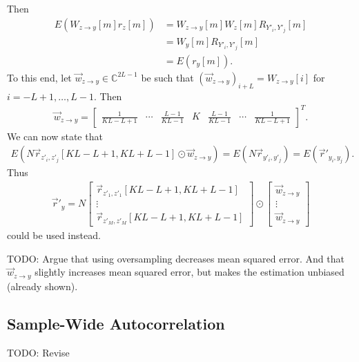 \documentclass[a4paper, openany, oneside]{memoir}
\begin{document}
Then
\begin{align*}
    E(W_{z \to y}[m]r_z[m]) &= W_{z \to y}[m] W_z[m] R_{Y'_i,Y'_j}[m] \\
    &= W_y[m] R_{Y'_i,Y'_j}[m] \\
    &= E(r_y[m]).
\end{align*}
To this end, let $\vec{w}_{z \to y} \in \mathbb{C}^{2L-1}$ be such that $(\vec{w}_{z \to y})_{i+L} = W_{z \to y}[i]$ for $i = -L+1,\ldots,L-1$. Then
\begin{align*}
    \vec{w}_{z \to y} =\begin{bmatrix}
        \frac{1}{KL - L + 1} & \cdots & \frac{L- 1}{KL - 1} & K & \frac{L- 1}{KL - 1} & \cdots & \frac{1}{KL - L + 1}
    \end{bmatrix}^T.
\end{align*} 
We can now state that
\begin{align*}
    E(N \vec{r}_{z'_i,z'_j}[KL-L+1,KL+L-1] \odot \vec{w}_{z \to y}) = E(N \vec{r}_{y'_i,y'_j}) = E(\vec{r}'_{y_i,y_j}).
\end{align*}
Thus
\begin{align*}
    \vec{r}'_y = N\begin{bmatrix}
        \vec{r}_{z'_1,z'_1}[KL-L+1,KL+L-1] \\
        \vdots \\
        \vec{r}_{z'_M,z'_M}[KL-L+1,KL+L-1]
    \end{bmatrix} \odot \begin{bmatrix}
        \vec{w}_{z \to y} \\
        \vdots \\
        \vec{w}_{z \to y} 
    \end{bmatrix}
\end{align*}
could be used instead.

TODO: Argue that using oversampling decreases mean squared error. And that $\vec{w}_{z\to y}$ slightly increases mean squared error, but makes the estimation unbiased (already shown).


\subsection{Sample-Wide Autocorrelation}
TODO: Revise
\end{document}
